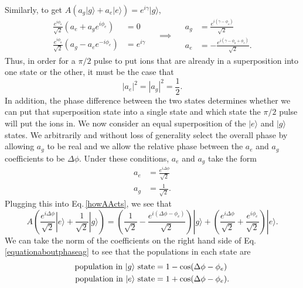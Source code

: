 Similarly, to get $A\left(a_g|g\rangle+a_e|e\rangle\right)=e^{i\gamma}|g\rangle$,
\begin{equation}
\begin{aligned}
\frac{e^{i\phi_o}}{\sqrt{2}}\left(a_e+a_ge^{i\phi_e}\right) &= 0 \\
\frac{e^{i\phi_o}}{\sqrt{2}}\left(a_g-a_e e^{-i\phi_e}\right) &= e^{i\gamma} 
\end{aligned}
\quad\implies\quad
\begin{aligned}
a_g&=\frac{e^{i(\gamma-\phi_o)}}{\sqrt{2}}\\
a_e&=-\frac{e^{i(\gamma-\phi_o+\phi_e)}}{\sqrt{2}}.
\end{aligned}
\end{equation}
Thus, in order for a $\pi/2$ pulse to put ions that are already in a superposition into one state or the other, it must be the case that 
\begin{equation}
|a_e|^2=|a_g|^2=\frac{1}{2}.
\end{equation}
In addition, the phase difference between the two states determines whether we can put that superposition state into a single state and which state the $\pi/2$ pulse will put the ions in. We now consider an equal superposition of the $|e\rangle$ and $|g\rangle$ states. We arbitrarily and without loss of generality select the overall phase by allowing $a_g$ to be real and we allow the relative phase between the $a_e$ and $a_g$ coefficients to be $\Delta\phi$. Under these conditions, $a_e$ and $a_g$ take the form
\begin{align}
a_e&=\frac{e^{i\Delta \phi}}{\sqrt{2}} \\
a_g&=\frac{1}{\sqrt{2}}.
\end{align}
Plugging this into Eq.\,\eqref{howAActs}, we see that
\begin{equation}
A\left(
\frac{e^{i\Delta \phi}}{\sqrt{2}}|e\rangle 
+
\frac{1}{\sqrt{2}}|g\rangle
\right)
=
\left(
\frac{1}{\sqrt{2}} - \frac{e^{i(\Delta\phi-\phi_e)}}{\sqrt{2}}
\right) |g\rangle
+\left(
\frac{e^{i\Delta\phi}}{\sqrt{2}} + \frac{e^{i\phi_e}}{\sqrt{2}}
\right) |e\rangle. \label{equationaboutphaseag}
\end{equation}
We can take the norm of the coefficients on the right hand side of Eq.\,\ref{equationaboutphaseag} to see that the populations in each state are 
\begin{align}
\textnormal{population in $|g\rangle$ state} &= 1 - \cos(\Delta\phi-\phi_e) \label{gpop}\\ 
\textnormal{population in $|e\rangle$ state} &= 1 + \cos(\Delta\phi-\phi_e).\label{epop}
\end{align}
